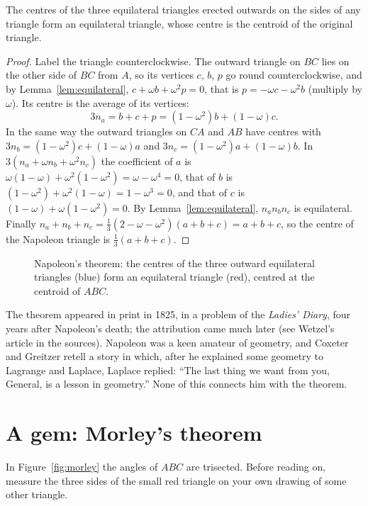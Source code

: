 \begin{theorem}\label{thm:napoleon}
The centres of the three equilateral triangles erected outwards on the sides of any triangle form an equilateral triangle, whose centre is
the centroid of the original triangle.
\end{theorem}
\begin{proof}
Label the triangle counterclockwise. The outward triangle on $BC$ lies on the other side of $BC$ from $A$, so its vertices $c$, $b$, $p$
go round counterclockwise, and by Lemma~\ref{lem:equilateral}, $c+\omega b+\omega^2p=0$, that is $p=-\omega c-\omega^2b$ (multiply by
$\omega$). Its centre is the average of its vertices:
\[
3n_a=b+c+p=(1-\omega^2)b+(1-\omega)c.
\]
In the same way the outward triangles on $CA$ and $AB$ have centres with $3n_b=(1-\omega^2)c+(1-\omega)a$ and
$3n_c=(1-\omega^2)a+(1-\omega)b$. In $3(n_a+\omega n_b+\omega^2n_c)$ the coefficient of $a$ is $\omega(1-\omega)+\omega^2(1-\omega^2)=
\omega-\omega^4=0$, that of $b$ is $(1-\omega^2)+\omega^2(1-\omega)=1-\omega^3=0$, and that of $c$ is $(1-\omega)+\omega(1-\omega^2)=0$.
By Lemma~\ref{lem:equilateral}, $n_an_bn_c$ is equilateral. Finally $n_a+n_b+n_c=\frac13(2-\omega-\omega^2)(a+b+c)=a+b+c$, so the centre of
the Napoleon triangle is $\frac13(a+b+c)$.
\end{proof}

\begin{figure}[ht]
\centering
{}
\caption{Napoleon's theorem: the centres of the three outward equilateral triangles (blue) form an equilateral triangle (red), centred at
the centroid of $ABC$.}
\label{fig:napoleon}
\end{figure}

The theorem appeared in print in 1825, in a problem of the \emph{Ladies' Diary}, four years after Napoleon's death; the attribution came
much later (see Wetzel's article in the sources). Napoleon was a keen amateur of geometry, and Coxeter and Greitzer retell a story
in which, after he explained some geometry to Lagrange and Laplace, Laplace replied: ``The last thing we want from you, General, is a
lesson in geometry.'' None of this connects him with the theorem.

\section{A gem: Morley's theorem}

\begin{think}
In Figure~\ref{fig:morley} the angles of $ABC$ are trisected. Before reading on, measure the three sides of the small red triangle on
your own drawing of some other triangle.
\end{think}

